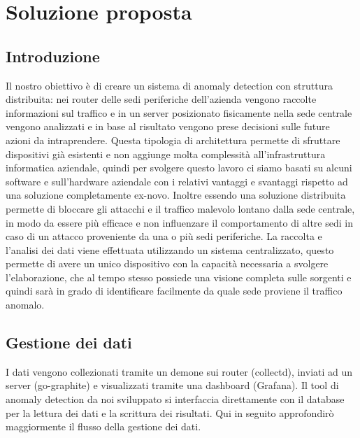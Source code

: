 \chapter{Soluzione proposta}\label{chapter:our_work}

\section{Introduzione}
Il nostro obiettivo è di creare un sistema di anomaly detection con struttura distribuita: nei router delle sedi periferiche dell'azienda vengono raccolte informazioni sul traffico e in un server posizionato fisicamente nella sede centrale vengono analizzati e in base al risultato vengono prese decisioni sulle future azioni da intraprendere. Questa tipologia di architettura permette di sfruttare dispositivi già esistenti e non aggiunge molta complessità all'infrastruttura informatica aziendale, quindi per svolgere questo lavoro ci siamo basati su alcuni software e sull'hardware aziendale con i relativi vantaggi e svantaggi rispetto ad una soluzione completamente ex-novo.
Inoltre essendo una soluzione distribuita permette di bloccare gli attacchi e il traffico malevolo lontano dalla sede centrale, in modo da essere più efficace e non influenzare il comportamento di altre sedi in caso di un attacco proveniente da una o più sedi periferiche.
La raccolta e l'analisi dei dati viene effettuata utilizzando un sistema centralizzato, questo permette di avere un unico dispositivo con la capacità necessaria a svolgere l'elaborazione, che al tempo stesso possiede una visione completa sulle sorgenti e quindi sarà in grado di identificare facilmente da quale sede proviene il traffico anomalo.


\section{Gestione dei dati}

I dati vengono collezionati tramite un demone sui router (collectd), inviati ad un server (go-graphite) e visualizzati tramite una dashboard (Grafana). Il tool di anomaly detection da noi sviluppato si interfaccia direttamente con il database per la lettura dei dati e la scrittura dei risultati.
Qui in seguito approfondirò maggiormente il flusso della gestione dei dati.

